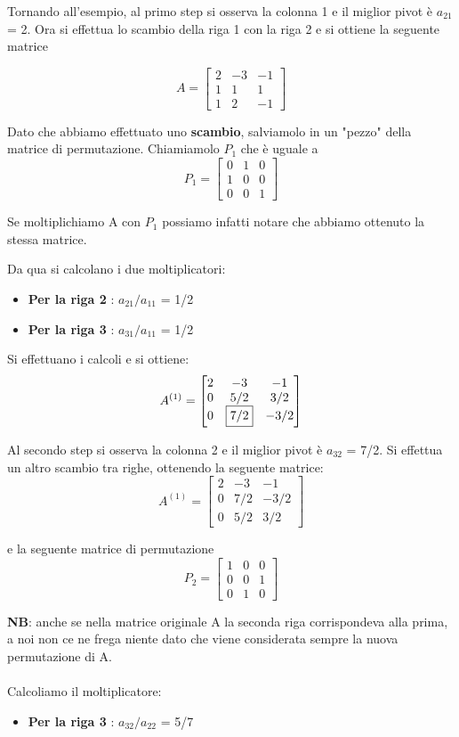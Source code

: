 Tornando all'esempio, al primo step si osserva la colonna 1 e il miglior pivot è $a_{21}$ = 2.
Ora si effettua lo scambio della riga 1 con la riga 2 e si ottiene la seguente matrice

$$ A =
\begin{bmatrix}
2 & -3 & -1 \\
1 & 1 & 1 \\
1 & 2 & -1 
\end{bmatrix}
$$

Dato che abbiamo effettuato uno \textbf{scambio}, salviamolo in un "pezzo" della matrice di permutazione. Chiamiamolo $P_1$ che è uguale a 
$$ P_1 =
\begin{bmatrix}
0 & 1 & 0 \\
1 & 0 & 0 \\
0 & 0 & 1 
\end{bmatrix}
$$

Se moltiplichiamo A con $P_1$ possiamo infatti notare che abbiamo ottenuto la stessa matrice.

Da qua si calcolano i due moltiplicatori:
\begin{itemize}
\item \textbf{Per la riga 2 }:  $a_{21}/a_{11}$ = 1/2
\item \textbf{Per la riga 3 }:  $a_{31}/a_{11}$ = 1/2
\end{itemize}

Si effettuano i calcoli e si ottiene:
$$ A^{(1)} =
\begin{bmatrix}
2 & -3 & -1 \\
0 & 5/2 & 3/2 \\
0 & \fbox{7/2} & -3/2 
\end{bmatrix}
$$

Al secondo step si osserva la colonna 2 e il miglior pivot è $a_{32}$ = 7/2. Si effettua un altro scambio tra righe, ottenendo la seguente matrice:
$$ A^{(1)} =
\begin{bmatrix}
2 & -3 & -1 \\
0 & 7/2 & -3/2 \\
0 & 5/2 & 3/2
\end{bmatrix}
$$

e la seguente matrice di permutazione
$$ P_2 =
\begin{bmatrix}
1 & 0 & 0 \\
0 & 0 & 1 \\
0 & 1 & 0 
\end{bmatrix}
$$

\textbf{NB}: anche se nella matrice originale A la seconda riga corrispondeva alla prima, a noi non ce ne frega niente dato che viene considerata sempre la nuova permutazione di A.
\\ \\
Calcoliamo il moltiplicatore:
\begin{itemize}
\item \textbf{Per la riga 3 }:  $a_{32}/a_{22}$ = 5/7
\end{itemize}

